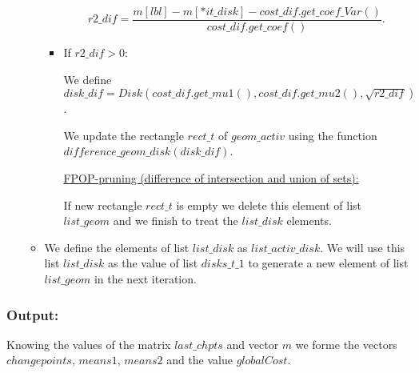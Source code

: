 \documentclass{report}
\begin{document}
\begin{itemize}
\begin{itemize}
\begin{itemize}
			\begin{equation}
					r2\_dif = \frac {m[lbl] - m[*it\_disk] - cost\_dif.get\_coef\_Var()}{   			cost\_dif.get\_coef()}.
						\label{eq:radiusDif}
			\end{equation}
			\item If $r2\_dif > 0$: 
		
			We define $disk\_dif = Disk(cost\_dif.get\_mu1(), cost\_dif.get\_mu2(), \sqrt{r2\_dif})$.
			
			We update the rectangle $rect\_t$ of $geom\_activ$ using the function $difference\_geom\_disk(disk\_dif)$.
			
			\underline {FPOP-pruning (difference of intersection and union of sets):}
					
			If new rectangle $rect\_t$ is empty we delete this element of list $list\_geom$ and we finish to treat the $list\_disk$ elements.
					
		\end{itemize} 
	\item We define the elements of list $list\_disk$ as $list\_activ\_disk$. We will use this list $list\_disk$  as the value of list $disks\_t\_1$ to generate a new element of list $list\_geom$ in the next iteration.
	\end{itemize} 
\end{itemize} 
	
\subsubsection*{Output:}

Knowing the values of the matrix $last\_chpts$ and vector  $m$ we forme the vectors  $changepoints$, $means1$, $means2$ and the value $globalCost$.
	
\end{document}
